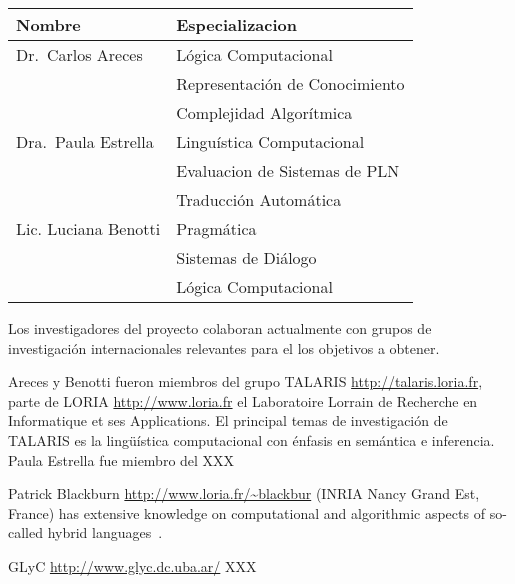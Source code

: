 
\begin{center}\small
    \begin{minipage}{\linewidth}
        \begin{center}
        \begin{tabular}{|l|l|}
        \hline\hline
        Nombre &  Especializacion \\
        \hline
        Dr.\ Carlos Areces &
          L\'ogica Computacional\\
        & Representaci\'on de Conocimiento\\
        & Complejidad Algor\'itmica
      \\ \hline
        Dra.\ Paula Estrella &
          Lingu\'istica Computacional \\
        & Evaluacion de Sistemas de PLN
      \\
		& Traducci\'on Autom\'atica \\ \hline
        Lic. Luciana Benotti &
          Pragm\'atica \\
        & Sistemas de Di\'alogo\\
        & L\'ogica Computacional\\
        \hline\hline
        \end{tabular}
        \end{center}
    \end{minipage}
\end{center}


Los investigadores del proyecto colaboran actualmente
con grupos de investigaci\'on internacionales relevantes para
el los objetivos a obtener.

Areces y Benotti fueron miembros
del grupo TALARIS \url{http://talaris.loria.fr}, parte de
LORIA \url{http://www.loria.fr} el Laboratoire Lorrain de Recherche en Informatique et ses Applications. El principal temas de investigaci\'on de TALARIS es la ling\"u\'istica
computacional con \'enfasis en sem\'antica e inferencia.  Paula Estrella
fue miembro del XXX 



Patrick Blackburn \url{http://www.loria.fr/~blackbur} (INRIA Nancy Grand Est, France) has
extensive knowledge on computational and algorithmic aspects of
so-called hybrid languages~\citep{arec:hybr01,blac:hybr98c}.

GLyC \url{http://www.glyc.dc.uba.ar/} XXX

